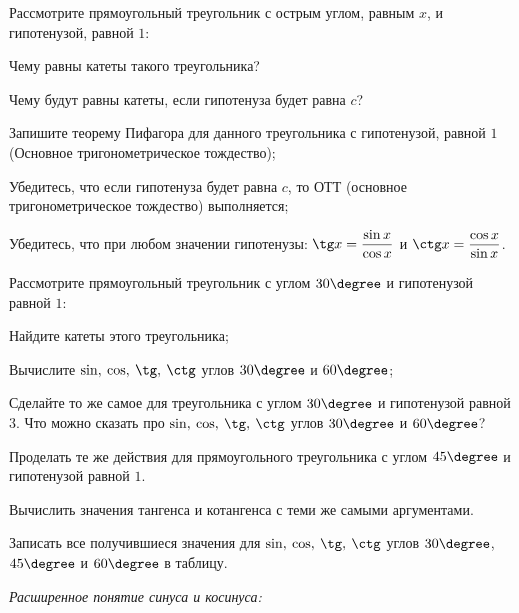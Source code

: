 %
%
%
%
\begin{class}[number=2]
	\begin{listofex}
		\item Рассмотрите прямоугольный треугольник с острым углом, равным \( x \), и гипотенузой, равной \( 1 \):
		\begin{enumcols}
			\item Чему равны катеты такого треугольника?
			\item Чему будут равны катеты, если гипотенуза будет равна \( c \)?
			\item Запишите теорему Пифагора для данного треугольника с гипотенузой, равной \( 1 \) (Основное тригонометрическое тождество);
			\item Убедитесь, что если гипотенуза будет равна \( c \), то ОТТ (основное тригонометрическое тождество) выполняется;
			\item Убедитесь, что при любом значении гипотенузы: \( \tg x = \dfrac{\sin x}{\cos x} \) и \( \ctg x = \dfrac{\cos x}{\sin x} \).
		\end{enumcols}
		\item Рассмотрите прямоугольный треугольник с углом \( 30\degree \) и гипотенузой равной \( 1 \):
		\begin{enumcols}
			\item Найдите катеты этого треугольника;
			\item Вычислите \( \sin,\:\cos,\:\tg,\:\ctg \) углов \( 30\degree \) и \( 60\degree \);
			\item Сделайте то же самое для треугольника с углом \( 30\degree \) и гипотенузой равной \( 3 \). Что можно сказать про \( \sin,\:\cos,\:\tg,\:\ctg \) углов \( 30\degree \) и \( 60\degree \)?
		\end{enumcols}
		\item Проделать те же действия для прямоугольного треугольника с углом \( 45\degree \) и гипотенузой равной \( 1 \).
		\item Вычислить значения тангенса и котангенса с теми же самыми аргументами.
		\item Записать все получившиеся значения для \( \sin,\:\cos,\:\tg,\:\ctg \) углов \( 30\degree \), \( 45\degree \) и \( 60\degree \) в таблицу.
		\item \textit{Расширенное понятие синуса и косинуса:}\\[0.5em]
\end{listofex}
\end{class}
